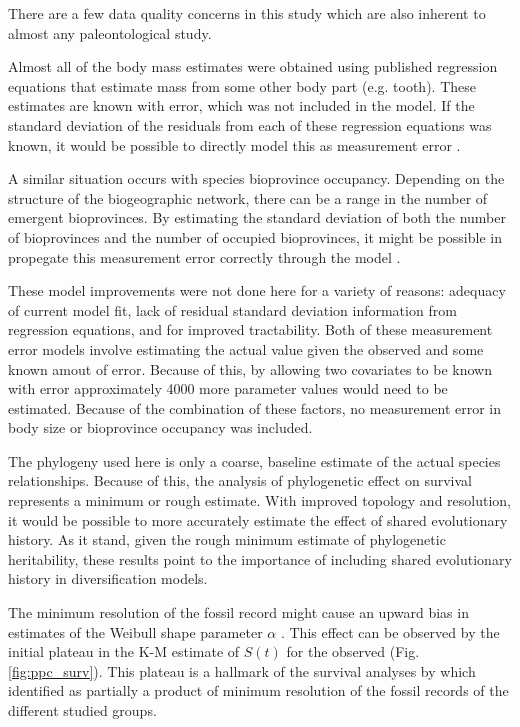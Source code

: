 \documentclass[12pt,letterpaper]{article}
\begin{document}
There are a few data quality concerns in this study which are also inherent to almost any paleontological study.

Almost all of the body mass estimates were obtained using published regression equations that estimate mass from some other body part (e.g. tooth). These estimates are known with error, which was not included in the model. If the standard deviation of the residuals from each of these regression equations was known, it would be possible to directly model this as measurement error \citep{Gelman2013d}. 

A similar situation occurs with species bioprovince occupancy. Depending on the structure of the biogeographic network, there can be a range in the number of emergent bioprovinces. By estimating the standard deviation of both the number of bioprovinces and the number of occupied bioprovinces, it might be possible in propegate this measurement error correctly through the model \citep{Gelman2013d}. 

These model improvements were not done here for a variety of reasons: adequacy of current model fit, lack of residual standard deviation information from regression equations, and for improved tractability. Both of these measurement error models involve estimating the actual value given the observed and some known amout of error. Because of this, by allowing two covariates to be known with error approximately 4000 more parameter values would need to be estimated. Because of the combination of these factors, no measurement error in body size or bioprovince occupancy was included.

The phylogeny used here is only a coarse, baseline estimate of the actual species relationships. Because of this, the analysis of phylogenetic effect on survival represents a minimum or rough estimate. With improved topology and resolution, it would be possible to more accurately estimate the effect of shared evolutionary history. As it stand, given the rough minimum estimate of phylogenetic heritability, these results point to the importance of including shared evolutionary history in diversification models.

The minimum resolution of the fossil record might cause an upward bias in estimates of the Weibull shape parameter \(\alpha\) \citep{Sepkoski1975}. This effect can be observed by the initial plateau in the K-M estimate of \(S(t)\) for the observed (Fig. \ref{fig:ppc_surv}). This plateau is a hallmark of the survival analyses by \citet{VanValen1973} which \citet{Sepkoski1975} identified as partially a product of minimum resolution of the fossil records of the different studied groups.
\end{document}
